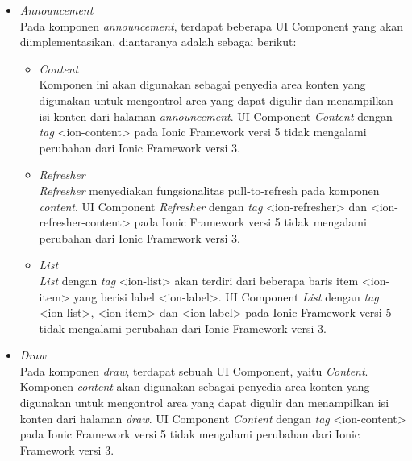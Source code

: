 \begin{itemize}
	\item \textit{Announcement} \\
	Pada komponen \textit{announcement}, terdapat beberapa UI Component yang akan diimplementasikan, diantaranya adalah sebagai berikut:
	\begin{itemize}
		\item \textit{Content} \\
		Komponen ini akan digunakan sebagai penyedia area konten yang digunakan untuk mengontrol area yang dapat digulir dan menampilkan isi konten dari halaman \textit{announcement}. UI Component \textit{Content} dengan \textit{tag} <ion-content> pada Ionic Framework versi 5 tidak mengalami perubahan dari Ionic Framework versi 3.
		
		\item \textit{Refresher} \\
		\textit{Refresher} menyediakan fungsionalitas  pull-to-refresh pada komponen \textit{content}. UI Component \textit{Refresher} dengan \textit{tag} <ion-refresher> dan <ion-refresher-content> pada Ionic Framework versi 5 tidak mengalami perubahan dari Ionic Framework versi 3.

\newpage

		\item \textit{List} \\
		\textit{List} dengan \textit{tag} <ion-list> akan terdiri dari beberapa baris item <ion-item> yang berisi label <ion-label>. UI Component \textit{List} dengan \textit{tag} <ion-list>, <ion-item> dan <ion-label> pada Ionic Framework versi 5 tidak mengalami perubahan dari Ionic Framework versi 3.
		
	\end{itemize}
	
	\item \textit{Draw} \\
	Pada komponen \textit{draw}, terdapat sebuah UI Component, yaitu \textit{Content}. Komponen \textit{content} akan digunakan sebagai penyedia area konten yang digunakan untuk mengontrol area yang dapat digulir dan menampilkan isi konten dari halaman \textit{draw}. UI Component \textit{Content} dengan \textit{tag} <ion-content> pada Ionic Framework versi 5 tidak mengalami perubahan dari Ionic Framework versi 3. 
		

\end{itemize}
